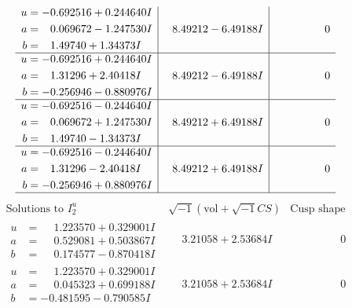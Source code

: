 \documentclass[1p]{elsarticle_modified}
\theoremstyle{definition}
\newcommand{\I}{\sqrt{-1}}
\begin{document}
$$\begin{array}{c|c|c}
\begin{aligned}
u &= -0.692516 + 0.244640 I \\
a &= \phantom{-}0.069672 - 1.247530 I \\
b &= \phantom{-}1.49740 + 1.34373 I\end{aligned}
 & \phantom{-}8.49212 - 6.49188 I & \phantom{-0.000000 } 0 \\ \hline\begin{aligned}
u &= -0.692516 + 0.244640 I \\
a &= \phantom{-}1.31296 + 2.40418 I \\
b &= -0.256946 - 0.880976 I\end{aligned}
 & \phantom{-}8.49212 - 6.49188 I & \phantom{-0.000000 } 0 \\ \hline\begin{aligned}
u &= -0.692516 - 0.244640 I \\
a &= \phantom{-}0.069672 + 1.247530 I \\
b &= \phantom{-}1.49740 - 1.34373 I\end{aligned}
 & \phantom{-}8.49212 + 6.49188 I & \phantom{-0.000000 } 0 \\ \hline\begin{aligned}
u &= -0.692516 - 0.244640 I \\
a &= \phantom{-}1.31296 - 2.40418 I \\
b &= -0.256946 + 0.880976 I\end{aligned}
 & \phantom{-}8.49212 + 6.49188 I & \phantom{-0.000000 } 0\\
 \hline 
 \end{array}$$\newpage$$\begin{array}{c|c|c}  
\text{Solutions to }I^u_{2}& \I (\text{vol} + \sqrt{-1}CS) & \text{Cusp shape}\\
 \hline 
\begin{aligned}
u &= \phantom{-}1.223570 + 0.329001 I \\
a &= \phantom{-}0.529081 + 0.503867 I \\
b &= \phantom{-}0.174577 - 0.870418 I\end{aligned}
 & \phantom{-}3.21058 + 2.53684 I & \phantom{-0.000000 } 0 \\ \hline\begin{aligned}
u &= \phantom{-}1.223570 + 0.329001 I \\
a &= \phantom{-}0.045323 + 0.699188 I \\
b &= -0.481595 - 0.790585 I\end{aligned}
 & \phantom{-}3.21058 + 2.53684 I & \phantom{-0.000000 } 0 \\ \hline\begin{aligned}

\end{aligned}
\end{array}$$
\end{document}
